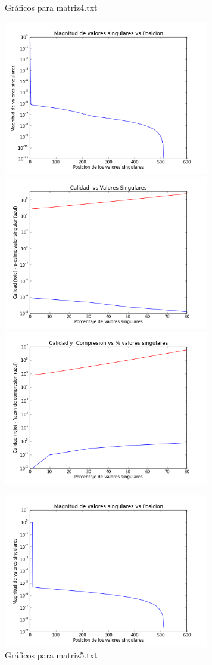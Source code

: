 \documentclass[spanish, fleqn]{article}
\begin{document}
	\begin{figure}[htbp]
		\begin{minipage}[b]{0.5\linewidth}
			\caption{Gráficos para matriz4.txt}
			\includegraphics[width=90mm]{./Graficos/matriz4-svalue}
			\includegraphics[width=90mm]{./Graficos/matriz4-quality}
			\includegraphics[width=90mm]{./Graficos/matriz4-size}
			\label{fig:figura7}
		\end{minipage}%
		\begin{minipage}[b]{0.5\linewidth}
			\caption{Gráficos para matriz5.txt}
			\includegraphics[width=90mm]{./Graficos/matriz5-svalue}

\end{minipage}
\end{figure}
\end{document}
